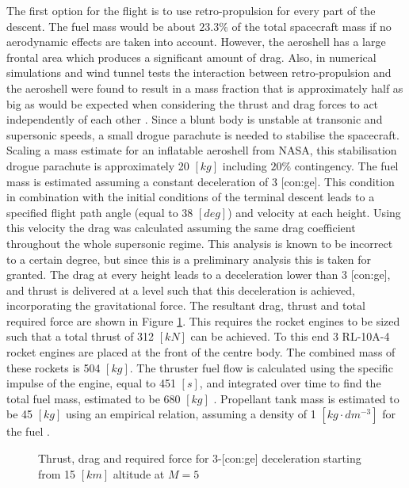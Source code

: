 The first option for the flight is to use retro-propulsion for every part of the descent. The fuel mass would be about $23.3\%$ of the total spacecraft mass if no aerodynamic effects are taken into account. However, the aeroshell has a large frontal area which produces a significant amount of drag. Also, in numerical simulations and wind tunnel tests the interaction between retro-propulsion and the aeroshell were found to result in a mass fraction that is approximately half as big as would be expected when considering the thrust and drag forces to act independently of each other \cite{Korzun2009}. Since a blunt body is unstable at transonic and supersonic speeds, a small drogue parachute is needed to stabilise the spacecraft. Scaling a mass estimate for an inflatable aeroshell from NASA, this stabilisation drogue parachute is approximately 20 $[kg]$ including $20\%$ contingency.
The fuel mass is estimated assuming a constant deceleration of 3 [\gls{con:ge}]. This condition in combination with the initial conditions of the terminal descent leads to a specified flight path angle (equal to 38 $[deg]$) and velocity at each height. Using this velocity the drag was calculated assuming the same drag coefficient throughout the whole supersonic regime. This analysis is known to be incorrect to a certain degree, but since this is a preliminary analysis this is taken for granted. The drag at every height leads to a deceleration lower than 3 [\gls{con:ge}], and thrust is delivered at a level such that this deceleration is achieved, incorporating the gravitational force. The resultant drag, thrust and total required force are shown in Figure \ref{fig:TDforce}. This requires the rocket engines to be sized such that a total thrust of 312 $[kN]$ can be achieved. To this end 3 RL-10A-4 rocket engines are placed at the front of the centre body. The combined mass of these rockets is 504 $[kg]$. The thruster fuel flow is calculated using the specific impulse of the engine, equal to 451 $[s]$, and integrated over time to find the total fuel mass, estimated to be 680 $[kg]$ \cite{Wertz2011}. Propellant tank mass is estimated to be 45 $[kg]$ using an empirical relation, assuming a density of 1 $[kg\cdot dm^{-3}]$ for the fuel \cite{Wertz2011}.

\begin{figure}[h]
	\centering
	\setlength{} 
	\setlength{}
	
	\caption{Thrust, drag and required force for 3-[\gls{con:ge}] deceleration starting from 15 $[km]$ altitude at $M=5$}
	\label{fig:TDforce}
\end{figure}



